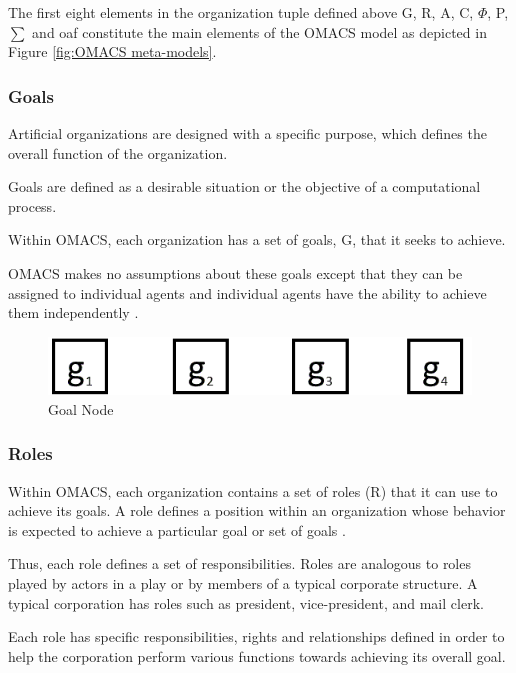 The first eight elements in the organization tuple defined above G, R, A, C, $\varPhi$, P, $\sum$ and oaf  constitute the main elements of the OMACS model as depicted in Figure \ref{fig:OMACS meta-models}.

\subsubsection{Goals}

Artificial organizations are designed with a specific purpose, which defines the overall function
of the organization\cite{omacs2}.

Goals are defined as a desirable situation or the objective of a
computational process.

Within OMACS, each organization has a set of goals, G, that it seeks
to achieve.

OMACS makes no assumptions about these goals except that they can be assigned to
individual agents and individual agents have the ability to achieve them independently \cite{omacs2}.
\hspace{1cm}
\begin{figure}[th]
	\centering
		\includegraphics[scale=0.5]{ch1/img/goals}
	\caption{\label{fig:Goal Node}Goal Node }
\end{figure}
\hspace{1cm}
\subsubsection{Roles} 

Within OMACS, each organization contains a set of roles (R) that it can use to achieve its goals.
A role defines a position within an organization whose behavior is expected to achieve a
particular goal or set of goals \cite{omacs2}.

Thus, each role defines a set of responsibilities. Roles are
analogous to roles played by actors in a play or by members of a typical corporate structure. A
typical corporation has roles such as  president,  vice-president, and  mail clerk.  

Each role has specific responsibilities, rights and relationships defined in order to help the corporation
perform various functions towards achieving its overall goal. 


